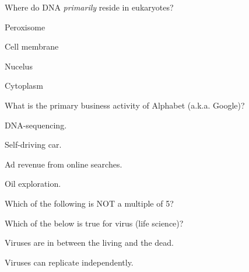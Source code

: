 \documentclass[12pt]{exam}
\begin{document}
\begin{questions}
\begin{oneparchoices}
        
        
        
        \end{oneparchoices}

    \question Where do DNA \textit{primarily} reside in eukaryotes?
    
        \begin{oneparchoices}
        
            \choice Peroxisome
        
            \choice Cell membrane
        
            \choice Nucelus
        
            \choice Cytoplasm
        
        \end{oneparchoices}

    \question What is the primary business activity of Alphabet (a.k.a. Google)?
    
        \begin{oneparchoices}
        
            \choice DNA-sequencing.
        
            \choice Self-driving car.
        
            \choice Ad revenue from online searches.
        
            \choice Oil exploration.
        
        \end{oneparchoices}

    \question Which of the following is NOT a multiple of 5?
    
        \begin{oneparchoices}
        
        
        
        
        
        \end{oneparchoices}

    \question Which of the below is true for virus (life science)?
    
        \begin{oneparchoices}
        
            \choice Viruses are in between the living and the dead.
        
            \choice Viruses can replicate independently.
        
        \end{oneparchoices}

\end{questions}
\pagebreak
\end{document}
